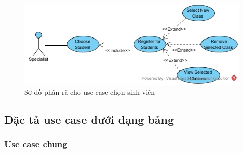 \documentclass[12pt]{article}
\begin{document}
  \FloatBarrier
  \begin{figure}[ht]
    \centering
    \includegraphics[scale=0.5]{../pictures/projectdiagrams/Choose-Student-uc-destructing.jpg}
    \caption{Sơ đồ phân rã cho use case chọn sinh viên}
  \end{figure}
  \FloatBarrier

  \newpage
  \subsection{Đặc tả use case dưới dạng bảng}

  \subsubsection*{Use case chung}
\end{document}
